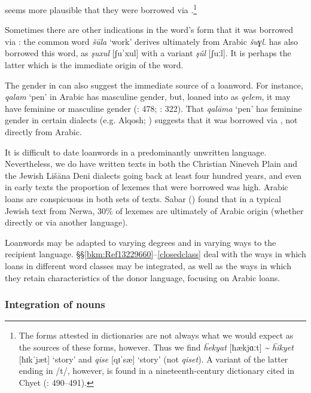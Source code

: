\documentclass[output=paper]{langsci/langscibook}
\begin{document}
seems more plausible that they were borrowed via .\footnote{The  forms attested in dictionaries are not always what we would expect as the sources of these forms, however. Thus we find \textit{ḧekyat} [ħækjɑːt] \textit{{\textasciitilde} ḧikyet} [ħɪk\textrm{ˈ}jæt] ‘story’  and \textit{qise} [qɪ\textrm{ˈ}sæ] ‘story’ (not \textit{qiset}). A variant of the latter ending in /t/, however, is found in a nineteenth-century dictionary cited in Chyet (\citeyear{Chyet2003}: 490–491).}

Sometimes there are other indications in the word’s form that it was borrowed via : the common  word \textit{šūla} ‘work’ derives ultimately from Arabic \textit{šuɣl}.  has also borrowed this word, as \textit{şuxul} [ʃuˈxul] with a variant \textit{şûl} [ʃuːl]. It is perhaps the latter which is the immediate origin of the  word.

The {gender} in  can also suggest the immediate source of a {loanword}. For instance, \textit{qalam} ‘pen’ in Arabic has masculine {gender}, but, loaned into  as \textit{qelem}, it may have feminine or masculine {gender} (\citealt{Chyet2003}: 478; \citealt{Rizgar1993}: 322). That \textit{qalāma} ‘pen’ has feminine {gender} in certain  dialects (e.g. Alqosh; \citealt[199]{Coghill2004}) suggests that it was borrowed via , not directly from Arabic.

It is difficult to date {loanwords} in a predominantly unwritten language. Nevertheless, we do have written texts in both the Christian Nineveh Plain and the Jewish Lišāna Deni dialects going back at least four hundred years, and even in early texts the proportion of lexemes that were borrowed was high. Arabic loans are conspicuous in both sets of texts. Sabar (\citeyear[208]{Sabar1984}) found that in a typical Jewish text from Nerwa, 30\% of lexemes are ultimately of Arabic origin (whether directly or via another language).

Loanwords may be adapted to varying degrees and in varying ways to the {recipient language}. §§\ref{bkm:Ref13229660}–\ref{closedclass} deal with the ways in which loans in different word classes may be integrated, as well as the ways in which they retain characteristics of the donor language, {focusing} on Arabic loans.

\subsubsection{\label{bkm:Ref13229660}Integration of nouns}
\end{document}
